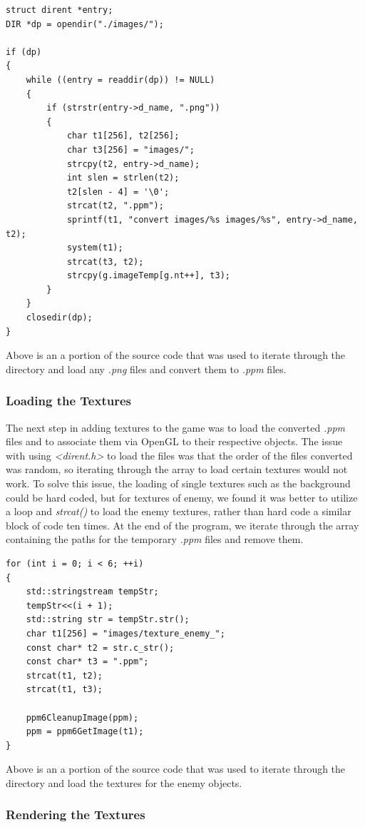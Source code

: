 \documentclass[12pt]{report}
\begin{document}
\begin{lstlisting}
struct dirent *entry;
DIR *dp = opendir("./images/");

if (dp)
{
	while ((entry = readdir(dp)) != NULL)
	{
		if (strstr(entry->d_name, ".png"))
		{
			char t1[256], t2[256];
			char t3[256] = "images/";
			strcpy(t2, entry->d_name);
			int slen = strlen(t2);
			t2[slen - 4] = '\0';
			strcat(t2, ".ppm");
			sprintf(t1, "convert images/%s images/%s", entry->d_name, t2);
			system(t1);
			strcat(t3, t2);
			strcpy(g.imageTemp[g.nt++], t3);
		}
	}
	closedir(dp);
}
\end{lstlisting}
\noindent Above is an a portion of the source code that was used to iterate through the directory and load any \textit{.png} files and convert them to \textit{.ppm} files.

\subsubsection*{Loading the Textures}
The next step in adding textures to the game was to load the converted \textit{.ppm} files and to associate them via OpenGL to their respective objects. The issue with using \textit{<dirent.h>} to load the files was that the order of the files converted was random, so iterating through the array to load certain textures would not work. To solve this issue, the loading of single textures such as the background could be hard coded, but for textures of enemy, we found it was better to utilize a loop and \textit{strcat()} to load the enemy textures, rather than hard code a similar block of code ten times. At the end of the program, we iterate through the array containing the paths for the temporary \textit{.ppm} files and remove them. \bigskip

\begin{lstlisting}
for (int i = 0; i < 6; ++i)
{
	std::stringstream tempStr;
	tempStr<<(i + 1);
	std::string str = tempStr.str();
	char t1[256] = "images/texture_enemy_";
	const char* t2 = str.c_str();
	const char* t3 = ".ppm";
	strcat(t1, t2);
	strcat(t1, t3);

	ppm6CleanupImage(ppm);
	ppm = ppm6GetImage(t1);
}
\end{lstlisting}
\noindent Above is an a portion of the source code that was used to iterate through the directory and load the textures for the enemy objects. \bigskip

\subsubsection*{Rendering the Textures}
\end{document}
